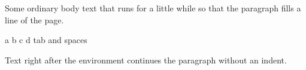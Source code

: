 \documentclass{article}
\begin{document}
Some ordinary body text that runs for a little while so that the paragraph fills a line of the page.
\begin{verbatim*}
a b  c   d
	tab and  spaces
\end{verbatim*}
Text right after the environment continues the paragraph without an indent.
\end{document}

